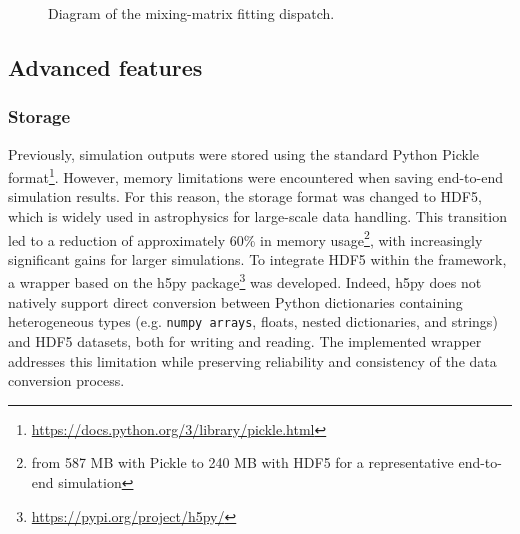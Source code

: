 \documentclass[../../thesis.tex]{subfiles}
\begin{document}
\begin{figure}[htbp]
{%
}
\caption{Diagram of the mixing-matrix fitting dispatch.}
\label{fig:diagram_mixingmatrix}
\end{figure}

\subsection{Advanced features}

\subsubsection{Storage}

Previously, simulation outputs were stored using the standard Python Pickle format\footnote{\url{https://docs.python.org/3/library/pickle.html}}. However, memory limitations were encountered when saving end-to-end simulation results. For this reason, the storage format was changed to HDF5, which is widely used in astrophysics for large-scale data handling.
This transition led to a reduction of approximately 60\% in memory usage\footnote{from 587 MB with Pickle to 240 MB with HDF5 for a representative end-to-end simulation}, with increasingly significant gains for larger simulations. To integrate HDF5 within the framework, a wrapper based on the h5py package\footnote{\url{https://pypi.org/project/h5py/}} was developed. Indeed, h5py does not natively support direct conversion between Python dictionaries containing heterogeneous types (e.g. \texttt{numpy arrays}, floats, nested dictionaries, and strings) and HDF5 datasets, both for writing and reading. The implemented wrapper addresses this limitation while preserving reliability and consistency of the data conversion process.
\end{document}

